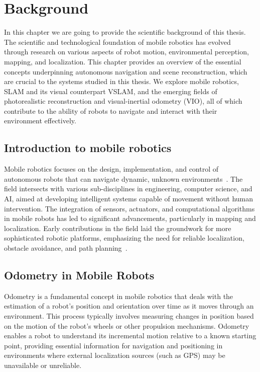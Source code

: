 \chapter{Background} \label{background}

In this chapter we are going to provide the scientific background of this thesis. The scientific and technological foundation of mobile robotics has evolved through research on various aspects of robot motion, environmental perception, mapping, and localization. This chapter provides an overview of the essential concepts underpinning autonomous navigation and scene reconstruction, which are crucial to the systems studied in this thesis. We explore mobile robotics, SLAM and its visual counterpart VSLAM, and the emerging fields of photorealistic reconstruction and visual-inertial odometry (VIO), all of which contribute to the ability of robots to navigate and interact with their environment effectively.

\section{Introduction to mobile robotics}

Mobile robotics focuses on the design, implementation, and control of autonomous robots that can navigate dynamic, unknown environments~\cite{probabilistic_robotics}. The field intersects with various sub-disciplines in engineering, computer science, and AI, aimed at developing intelligent systems capable of movement without human intervention. The integration of sensors, actuators, and computational algorithms in mobile robots has led to significant advancements, particularly in mapping and localization. Early contributions in the field laid the groundwork for more sophisticated robotic platforms, emphasizing the need for reliable localization, obstacle avoidance, and path planning~\cite{introduction_to_autonomous_mobile_robots}.

\section{Odometry in Mobile Robots}

Odometry is a fundamental concept in mobile robotics that deals with the estimation of a robot's position and orientation over time as it moves through an environment. This process typically involves measuring changes in position based on the motion of the robot’s wheels or other propulsion mechanisms. Odometry enables a robot to understand its incremental motion relative to a known starting point, providing essential information for navigation and positioning in environments where external localization sources (such as GPS) may be unavailable or unreliable.

